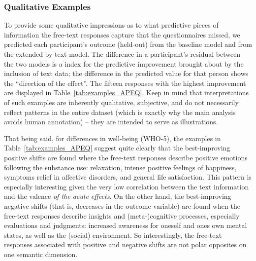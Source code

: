 \documentclass[man,floatsintext]{apa7}
\newcommand{\change}[1]{#1}
\begin{document}
\subsubsection{Qualitative Examples} To provide some qualitative impressions as to what predictive pieces of information the free-text responses capture that the questionnaires missed, we predicted each participant's outcome (\change{held-out}) from the baseline model and from the extended-by-text model. The difference in a participant's residual between the two models is a index for the predictive improvement brought about by the inclusion of text data; the difference in the predicted value for that person shows the ``direction of the effect''. The fifteen responses with the highest improvement are displayed in Table~\ref{tab:examples_APEQ}. Keep in mind that interpretations of such examples are inherently qualitative, subjective, and do not necessarily reflect patterns in the entire dataset (which is exactly why the main analysis avoids human annotation) -- they are intended to serve as illustrations. 

That being said, for differences in well-being (WHO-5), the examples in Table~\ref{tab:examples_APEQ} suggest quite clearly that the best-improving positive shifts are found where the free-text responses describe positive emotions following the substance use: relaxation, intense positive feelings of happiness, symptoms relief in affective disorders,  and general life satisfaction. This pattern is especially interesting given the very low correlation between the text information and the valence \emph{of the acute effects}. On the other hand, the best-improving negative shifts (that is, decreases in the outcome variable)  are found when the free-text responses describe insights and (meta-)cognitive processes, especially evaluations and judgments: increased awareness for oneself and ones own mental states, as well as the (social) environment. So interestingly, the free-text responses associated with positive and negative shifts are not polar opposites on one semantic dimension. 
\end{document}
